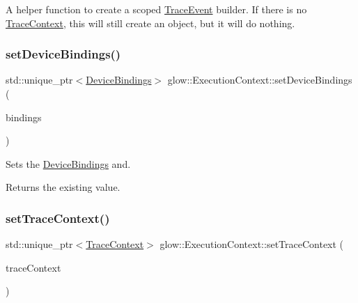 A helper function to create a scoped \hyperlink{structglow_1_1_trace_event}{Trace\+Event} builder. If there is no \hyperlink{classglow_1_1_trace_context}{Trace\+Context}, this will still create an object, but it will do nothing. \mbox{\label{classglow_1_1_execution_context_a557287e56fe650dd6f3ce11109d3788d}} 
\subsubsection{\texorpdfstring{set\+Device\+Bindings()}{setDeviceBindings()}}
{\footnotesize\ttfamily std\+::unique\+\_\+ptr$<$\hyperlink{classglow_1_1_device_bindings}{Device\+Bindings}$>$ glow\+::\+Execution\+Context\+::set\+Device\+Bindings (\begin{DoxyParamCaption}\item[{std\+::unique\+\_\+ptr$<$ \hyperlink{classglow_1_1_device_bindings}{Device\+Bindings} $>$}]{bindings }\end{DoxyParamCaption})\hspace{0.3cm}{\ttfamily [inline]}}



Sets the \hyperlink{classglow_1_1_device_bindings}{Device\+Bindings} and. 

\begin{DoxyReturn}{Returns}
the existing value. 
\end{DoxyReturn}
\mbox{\label{classglow_1_1_execution_context_a72b3080f584f93d53717c9c083222559}} 
\subsubsection{\texorpdfstring{set\+Trace\+Context()}{setTraceContext()}}
{\footnotesize\ttfamily std\+::unique\+\_\+ptr$<$\hyperlink{classglow_1_1_trace_context}{Trace\+Context}$>$ glow\+::\+Execution\+Context\+::set\+Trace\+Context (\begin{DoxyParamCaption}\item[{std\+::unique\+\_\+ptr$<$ \hyperlink{classglow_1_1_trace_context}{Trace\+Context} $>$}]{trace\+Context }\end{DoxyParamCaption})\hspace{0.3cm}{\ttfamily [inline]}}



